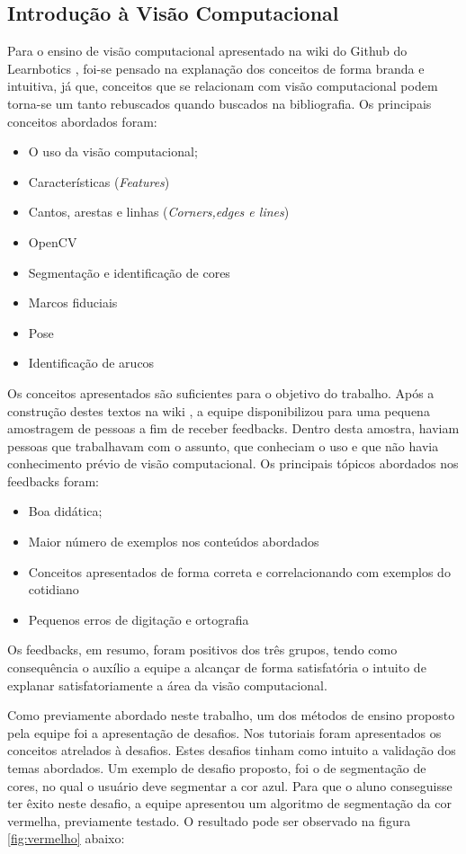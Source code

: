 \subsection{Introdução à Visão Computacional}
Para o ensino de visão computacional apresentado na wiki do Github do Learnbotics \cite{wikilearn}, foi-se pensado na explanação dos conceitos de forma branda e intuitiva, já que, conceitos que se relacionam com visão computacional podem torna-se um tanto rebuscados quando buscados na bibliografia. Os principais conceitos abordados foram:
\begin{itemize}
	\item O uso da visão computacional;
	\item Características  (\textit{Features})
	\item Cantos, arestas e linhas (\textit{Corners,edges e lines})
	\item OpenCV
	\item Segmentação e identificação de cores
	\item Marcos fiduciais
	\item Pose
	\item Identificação de arucos
	
\end{itemize}

Os conceitos apresentados são suficientes para o objetivo do trabalho. Após a construção destes textos na wiki \cite{tutVis}, a equipe disponibilizou para uma pequena amostragem de pessoas a fim de receber feedbacks. Dentro desta amostra, haviam pessoas que trabalhavam com o assunto, que conheciam o uso e que não havia conhecimento prévio de visão computacional. Os principais tópicos abordados nos feedbacks foram:

\begin{itemize}
	\item Boa didática;
	\item Maior número de exemplos nos conteúdos abordados
	\item Conceitos apresentados de forma correta e correlacionando com exemplos do cotidiano
	\item Pequenos erros de digitação e ortografia
\end{itemize}

Os feedbacks, em resumo, foram positivos dos três grupos, tendo como consequência o auxílio a equipe a alcançar de forma satisfatória o intuito de explanar satisfatoriamente a área da visão computacional.

Como previamente abordado neste trabalho, um dos métodos de ensino proposto pela equipe foi a apresentação de desafios. Nos tutoriais foram apresentados os conceitos atrelados à desafios. Estes desafios tinham como intuito a validação dos temas abordados. Um exemplo de desafio proposto, foi o de segmentação de cores, no qual o usuário deve segmentar a cor azul. Para que o aluno conseguisse ter êxito neste desafio, a equipe apresentou  um algoritmo de segmentação da cor vermelha, previamente testado. O resultado pode ser observado na figura \ref{fig:vermelho} abaixo:

